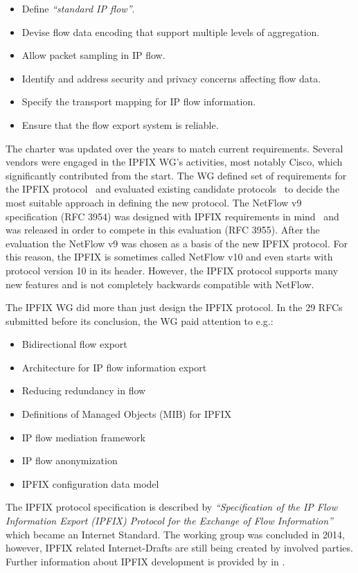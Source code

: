 \begin{itemize}
	\item Define \emph{``standard IP flow''}.
	\item Devise flow data encoding that support multiple levels of aggregation.
	\item Allow packet sampling in IP flow.
	\item Identify and address security and privacy concerns affecting flow data.
	\item Specify the transport mapping for IP flow information.
	\item Ensure that the flow export system is reliable.
\end{itemize}

The charter was updated over the years to match current requirements. Several vendors were engaged in the IPFIX WG’s activities, most notably Cisco, which significantly contributed from the start. The WG defined set of requirements for the IPFIX protocol~\cite{rfc3917} and evaluated existing candidate protocols~\cite{rfc3955} to decide the most suitable approach in defining the new protocol. The NetFlow v9 specification (RFC 3954) was designed with IPFIX requirements in mind~\cite{Trammell-2011-Introduction} and was released in order to compete in this evaluation (RFC 3955). After the evaluation the NetFlow v9 was chosen as a basis of the new IPFIX protocol. For this reason, the IPFIX is sometimes called NetFlow v10 and even starts with protocol version 10 in its header. However, the IPFIX protocol supports many new features and is not completely backwards compatible with NetFlow.

The IPFIX WG did more than just design the IPFIX protocol. In the 29 RFCs submitted before its conclusion, the WG paid attention to e.g.:
\begin{itemize}
	\item Bidirectional flow export~\cite{rfc5103}
	\item Architecture for IP flow information export~\cite{rfc5470}
	\item Reducing redundancy in flow~\cite{rfc5473}
	\item Definitions of Managed Objects (MIB) for IPFIX~\cite{rfc5815, rfc6615, rfc8038}
	\item IP flow mediation framework~\cite{rfc5982, rfc6183}
	\item IP flow anonymization~\cite{rfc6235}
	\item IPFIX configuration data model~\cite{rfc6728}
\end{itemize}
The IPFIX protocol specification is described by \emph{``Specification of the IP Flow Information Export (IPFIX) Protocol for the Exchange of Flow Information''}~\cite{rfc7011} which became an Internet Standard. The working group was concluded in 2014, however, IPFIX related Internet-Drafts are still being created by involved parties. Further information about IPFIX development is provided by \citeauthor{Brownlee-2011-Flow} in \cite{Brownlee-2011-Flow}.

